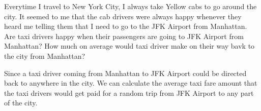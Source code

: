 \documentclass[12pt,twoside]{reedthesis}
\newenvironment{Shaded}{\begin{snugshade}}{\end{snugshade}}
\newcommand{\KeywordTok}[1]{\textcolor[rgb]{0.13,0.29,0.53}{\textbf{#1}}}
\newcommand{\DataTypeTok}[1]{\textcolor[rgb]{0.13,0.29,0.53}{#1}}
\newcommand{\DecValTok}[1]{\textcolor[rgb]{0.00,0.00,0.81}{#1}}
\newcommand{\FloatTok}[1]{\textcolor[rgb]{0.00,0.00,0.81}{#1}}
\newcommand{\StringTok}[1]{\textcolor[rgb]{0.31,0.60,0.02}{#1}}
\newcommand{\OperatorTok}[1]{\textcolor[rgb]{0.81,0.36,0.00}{\textbf{#1}}}
\newcommand{\NormalTok}[1]{#1}
\theoremstyle{definition}
\theoremstyle{definition}
\theoremstyle{definition}
\theoremstyle{remark}
\begin{document}
Everytime I travel to New York City, I always take Yellow cabs to go
around the city. It seemed to me that the cab drivers were always happy
whenever they heard me telling them that I need to go to the JFK Airport
from Manhattan. Are taxi drivers happy when their passengers are going
to JFK Airport from Manhattan? How much on average would taxi driver
make on their way bavk to the city from Manhattan?
\begin{Shaded}
\end{Shaded}
Since a taxi driver coming from Manhattan to JFK Airport could be
directed back to anywhere in the city. We can calculate the average taxi
fare amount that the taxi drivers would get paid for a random trip from
JFK Airport to any part of the city.
\begin{Shaded}
\end{Shaded}
\end{document}
